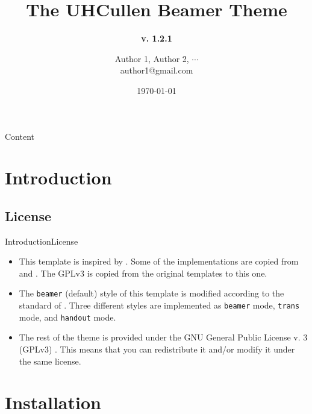 \documentclass[10pt,xcolor={dvipsnames},aspectratio=169]{beamer}
\title[UHCullen Theme]
{ %
  \textbf{The UHCullen Beamer Theme}
}
\subtitle[v. 1.2.1]
{
\textbf{v. 1.2.1}
}
\author[Author 1]
{Author 1\texorpdfstring{\footnotemark[1]}{},
Author 2\texorpdfstring{\footnotemark[2]}{},
\texorpdfstring{$\cdots$}{...}
\texorpdfstring{ \\
  {\ttfamily author1@gmail.com}
}{}}
\institute[]
{%
  \footnotemark[1]Affiliation 1\\
  \footnotemark[2]Affiliation 2
}
\date{\today} %
\begin{document}

\titleframe

\begin{frame}{Content}{}
\tableofcontents
\end{frame}

\section{Introduction}
\subsection{License}
\begin{frame}{Introduction}{License}

  \begin{itemize}
    \item<1-> This template is inspired by . Some of the implementations are copied from  and . The GPLv3 is copied from the original templates to this one.
    \item<2-> The \texttt{beamer} (default) style of this template is modified according to the standard of . Three different styles are implemented as \texttt{beamer} mode, \texttt{trans} mode, and \texttt{handout} mode.
    \item<3-> The rest of the theme is provided under the GNU General Public License v. 3 (GPLv3) . This means that you can redistribute it and/or modify it under the same license. 
  \end{itemize}
\end{frame}

\section{Installation}
\end{document}
